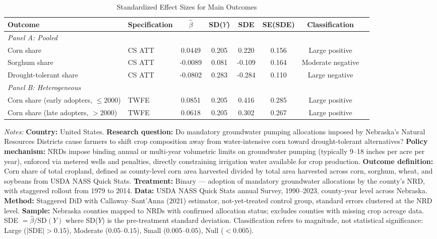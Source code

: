 \begin{table}[H]
\centering
\caption{Standardized Effect Sizes for Main Outcomes}
\label{tab:sde}
\begin{threeparttable}
\footnotesize
\begin{adjustbox}{max width=\textwidth}
\begin{tabular}{llcccccc}
\toprule
Outcome & Specification & $\hat{\beta}$ & SD($Y$) & SDE & SE(SDE) & Classification \\
\midrule
\multicolumn{7}{l}{\textit{Panel A: Pooled}} \\
Corn share & CS ATT & 0.0449 & 0.205 & 0.220 & 0.156 & Large positive \\
Sorghum share & CS ATT & -0.0089 & 0.081 & -0.109 & 0.164 & Moderate negative \\
Drought-tolerant share & CS ATT & -0.0802 & 0.283 & -0.284 & 0.110 & Large negative \\
\midrule
\multicolumn{7}{l}{\textit{Panel B: Heterogeneous}} \\
Corn share (early adopters, $\leq$2000) & TWFE & 0.0851 & 0.205 & 0.416 & 0.285 & Large positive \\
Corn share (late adopters, $>$2000) & TWFE & 0.0618 & 0.205 & 0.302 & 0.267 & Large positive \\
\bottomrule
\end{tabular}
\end{adjustbox}
\par\vspace{0.5em}
\noindent\begin{minipage}{\textwidth}
\scriptsize
\textit{Notes:} \textbf{Country:} United States. \textbf{Research question:} Do mandatory groundwater pumping allocations imposed by Nebraska's Natural Resources Districts cause farmers to shift crop composition away from water-intensive corn toward drought-tolerant alternatives? \textbf{Policy mechanism:} NRDs impose binding annual or multi-year volumetric limits on groundwater pumping (typically 9--18 inches per acre per year), enforced via metered wells and penalties, directly constraining irrigation water available for crop production. \textbf{Outcome definition:} Corn share of total cropland, defined as county-level corn area harvested divided by total area harvested across corn, sorghum, wheat, and soybeans from USDA NASS Quick Stats. \textbf{Treatment:} Binary --- adoption of mandatory groundwater allocations by the county's NRD, with staggered rollout from 1979 to 2014. \textbf{Data:} USDA NASS Quick Stats annual Survey, 1990--2023, county-year level across Nebraska. \textbf{Method:} Staggered DiD with Callaway--Sant'Anna (2021) estimator, not-yet-treated control group, standard errors clustered at the NRD level. \textbf{Sample:} Nebraska counties mapped to NRDs with confirmed allocation status; excludes counties with missing crop acreage data. SDE $= \hat{\beta} / \text{SD}(Y)$ where SD($Y$) is the pre-treatment standard deviation. Classification refers to magnitude, not statistical significance: Large ($|$SDE$| > 0.15$), Moderate ($0.05$--$0.15$), Small ($0.005$--$0.05$), Null ($< 0.005$).
\end{minipage}
\end{threeparttable}
\end{table}
